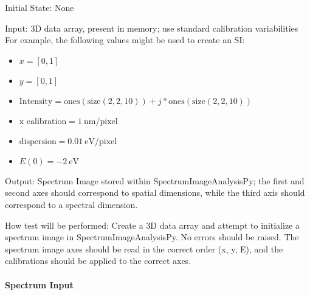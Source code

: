 \documentclass[12pt, titlepage]{article}
\newcommand{\progname}{SpectrumImageAnalysisPy}
\begin{document}
\begin{enumerate}
Initial State: None

Input: 3D data array, present in memory; use standard calibration variabilities\\
For example, the following values might be used to create an SI: 
\begin{itemize}
	\item $x = [0, 1]$
	\item $y = [0, 1]$
	\item $\text{Intensity} = \text{ones}(\text{size}(2,2,10)) + j * \text{ones}(\text{size}(2,2,10))$
	\item $\text{x calibration} = 1\ \si{\nano\metre}/\text{pixel}$
	\item $\text{dispersion} = 0.01\ \si{\electronvolt}/\text{pixel}$
	\item $E(0) = -2\ \si{\electronvolt}$
\end{itemize}

Output: Spectrum Image stored within \progname{}; the first and second axes should correspond to spatial dimensions, while the third axis should correspond to a spectral dimension.

How test will be performed: Create a 3D data array and attempt to initialize a spectrum image in \progname{}. No errors should be raised. The spectrum image axes should be read in the correct order (x, y, E), and the calibrations should be applied to the correct axes.

\end{enumerate}

\paragraph{Spectrum Input}
\end{document}
